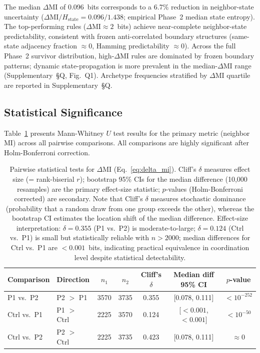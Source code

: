 \documentclass[letterpaper]{article}
\begin{document}
The median $\Delta\mathrm{MI}$ of 0.096~bits corresponds to a 6.7\% reduction in neighbor-state uncertainty ($\Delta\mathrm{MI}/H_{\mathrm{state}} = 0.096/1.438$; empirical Phase~2 median state entropy). The top-performing rules ($\Delta\mathrm{MI} \approx 2$~bits) achieve near-complete neighbor-state predictability, consistent with frozen anti-correlated boundary structures (same-state adjacency fraction $\approx 0$, Hamming predictability $\approx 0$). Across the full Phase~2 survivor distribution, high-$\Delta\mathrm{MI}$ rules are dominated by frozen boundary patterns; dynamic state-propagation is more prevalent in the median-$\Delta\mathrm{MI}$ range (Supplementary~\S{}Q, Fig.~Q1). Archetype frequencies stratified by $\Delta\mathrm{MI}$ quartile are reported in Supplementary~\S{}Q.

\subsection{Statistical Significance}

Table~\ref{tab:stats} presents Mann-Whitney $U$ test results for the primary
metric (neighbor MI) across all pairwise comparisons. All comparisons are
highly significant after Holm-Bonferroni correction.

\begin{table}[htbp]
\centering
\caption{Pairwise statistical tests for $\Delta\mathrm{MI}$
(Eq.~\ref{eq:delta_mi}).
Cliff's $\delta$ measures effect size (= rank-biserial $r$); bootstrap
95\% CIs for the median difference (10{,}000 resamples) are the
primary effect-size statistic; $p$-values (Holm-Bonferroni corrected) are
secondary.  Note that Cliff's $\delta$ measures stochastic dominance
(probability that a random draw from one group exceeds the other), whereas
the bootstrap CI estimates the location shift of the median difference.
Effect-size interpretation: $\delta = 0.355$ (P1 vs.\ P2) is moderate-to-large;
$\delta = 0.124$ (Ctrl vs.\ P1) is small but statistically reliable with $n > 2000$;
median differences for Ctrl vs.\ P1 are $<\!0.001$~bits, indicating practical
equivalence in coordination level despite statistical detectability.}
\label{tab:stats}
\begin{tabular}{llccccc}
\toprule
Comparison & Direction & $n_1$ & $n_2$ & Cliff's $\delta$ & Median diff 95\% CI & $p$-value \\
\midrule
P1 vs.\ P2      & P2 $>$ P1   & 3570 & 3735 & 0.355 & [0.078, 0.111] & $< 10^{-252}$ \\
Ctrl vs.\ P1    & P1 $>$ Ctrl & 2225 & 3570 & 0.124 & [$< 0.001$, $< 0.001$] & $< 10^{-50}$ \\
Ctrl vs.\ P2    & P2 $>$ Ctrl & 2225 & 3735 & 0.423 & [0.078, 0.111] & $\approx 0$ \\
\bottomrule
\end{tabular}
\end{table}
\end{document}
